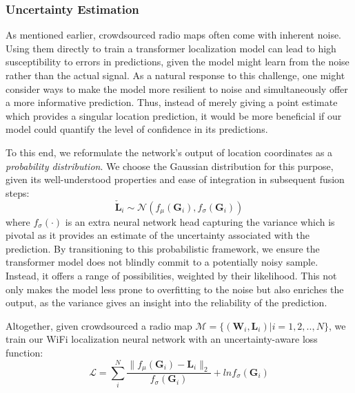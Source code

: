 \subsubsection{Uncertainty Estimation} 

As mentioned earlier, crowdsourced radio maps often come with inherent noise. Using them directly to train a transformer localization model can lead to high susceptibility to errors in predictions, given the model might learn from the noise rather than the actual signal. As a natural response to this challenge, one might consider ways to make the model more resilient to noise and simultaneously offer a more informative prediction. Thus, instead of merely giving a point estimate which provides a singular location prediction, it would be more beneficial if our model could quantify the level of confidence in its predictions. 

To this end, we reformulate the network's output of location coordinates as a \emph{probability distribution}. We choose the Gaussian distribution for this purpose, given its well-understood properties and ease of integration in subsequent fusion steps:
\begin{equation}
\mathbf{\check{L}}_i \sim \mathcal{N}(f_{\mu}(\mathbf{G}_i), f_{\sigma}(\mathbf{G}_i))
\end{equation}
where $f_{\sigma}(\cdot)$ is an extra neural network head capturing the variance which is pivotal as it provides an estimate of the uncertainty associated with the prediction. By transitioning to this probabilistic framework, we ensure the transformer model does not blindly commit to a potentially noisy sample. Instead, it offers a range of possibilities, weighted by their likelihood. This not only makes the model less prone to overfitting to the noise but also enriches the output, as the variance gives an insight into the reliability of the prediction. 

Altogether, given crowdsourced a radio map $\mathcal{M} = \{(\mathbf{W}_i, \mathbf{L}_i)|i=1,2,..,N\}$, we train our WiFi localization neural network with an uncertainty-aware loss function:
\begin{equation}
\mathcal{L} = \sum_{i}^{N} \frac{\lVert f_{\mu}(\mathbf{G}_i) - \mathbf{L}_i \rVert_2}{f_{\sigma}(\mathbf{G}_i)}+ln{f_{\sigma}(\mathbf{G}_i)} 
\end{equation}

